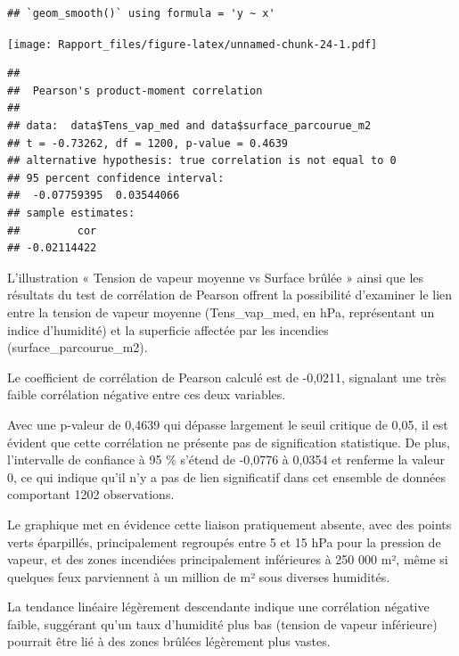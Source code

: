 \documentclass[
]{article}
\newenvironment{Shaded}{\begin{snugshade}}{\end{snugshade}}
\newcommand{\AttributeTok}[1]{\textcolor[rgb]{0.13,0.29,0.53}{#1}}
\newcommand{\FunctionTok}[1]{\textcolor[rgb]{0.13,0.29,0.53}{\textbf{#1}}}
\newcommand{\NormalTok}[1]{#1}
\newcommand{\SpecialCharTok}[1]{\textcolor[rgb]{0.81,0.36,0.00}{\textbf{#1}}}
\newcommand{\StringTok}[1]{\textcolor[rgb]{0.31,0.60,0.02}{#1}}
\begin{document}
\begin{verbatim}
## `geom_smooth()` using formula = 'y ~ x'
\end{verbatim}

\texttt{[image: Rapport\_files/figure-latex/unnamed-chunk-24-1.pdf]}

\begin{Shaded}
\end{Shaded}

\begin{verbatim}
## 
##  Pearson's product-moment correlation
## 
## data:  data$Tens_vap_med and data$surface_parcourue_m2
## t = -0.73262, df = 1200, p-value = 0.4639
## alternative hypothesis: true correlation is not equal to 0
## 95 percent confidence interval:
##  -0.07759395  0.03544066
## sample estimates:
##         cor 
## -0.02114422
\end{verbatim}

L'illustration « Tension de vapeur moyenne vs Surface brûlée » ainsi que
les résultats du test de corrélation de Pearson offrent la possibilité
d'examiner le lien entre la tension de vapeur moyenne (Tens\_vap\_med,
en hPa, représentant un indice d'humidité) et la superficie affectée par
les incendies (surface\_parcourue\_m2).

Le coefficient de corrélation de Pearson calculé est de -0,0211,
signalant une très faible corrélation négative entre ces deux variables.

Avec une p-valeur de 0,4639 qui dépasse largement le seuil critique de
0,05, il est évident que cette corrélation ne présente pas de
signification statistique. De plus, l'intervalle de confiance à 95 \%
s'étend de -0,0776 à 0,0354 et renferme la valeur 0, ce qui indique
qu'il n'y a pas de lien significatif dans cet ensemble de données
comportant 1202 observations.

Le graphique met en évidence cette liaison pratiquement absente, avec
des points verts éparpillés, principalement regroupés entre 5 et 15 hPa
pour la pression de vapeur, et des zones incendiées principalement
inférieures à 250 000 m², même si quelques feux parviennent à un million
de m² sous diverses humidités.

La tendance linéaire légèrement descendante indique une corrélation
négative faible, suggérant qu'un taux d'humidité plus bas (tension de
vapeur inférieure) pourrait être lié à des zones brûlées légèrement plus
vastes.
\end{document}
